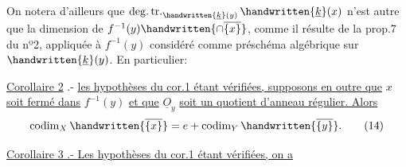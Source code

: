 On notera d'ailleurs que $\operatorname{deg.tr.}_{\handwritten{\underline k}(y)}\handwritten{\underline k}(x)$ n'est autre que la dimension de $f^{-1}(y)\handwritten{\cap\overline{\{x\}}}$, comme il résulte de la prop.7 du nº2, appliquée à $f^{-1}(y)$ considéré comme préschéma algébrique sur $\handwritten{\underline k}(y)$. En particulier:

\uline{Corollaire 2} .-  \uline{les hypothèses du cor.1 étant vérifiées, supposons en outre que} $x$ \uline{soit fermé dans} $f^{-1}(y)$ \uline{et que} $\underline O_y$ \uline{soit un quotient d'anneau régulier. Alors}
\[
 \operatorname{codim}_X\handwritten{\overline{\{x\}}}
 =e+\operatorname{codim}_Y\handwritten{\overline{\{y\}}}.\tag*{(14)}
\]

\uline{Corollaire 3 .- Les hypothèses du cor.1 étant vérifiées, on a}
